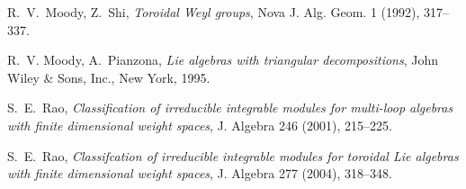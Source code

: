 \documentclass[11pt]{amsproc}
\theoremstyle{definition}
\theoremstyle{remark}
\numberwithin{equation}{section} \errorcontextlines=0
\begin{document}
\begin{thebibliography}{99}
 R.~V.~Moody, Z.~Shi, {\em Toroidal Weyl groups},
Nova J. Alg. Geom. 1 (1992), 317--337.

 R.~V. Moody, A.~Pianzona, {\em Lie algebras with triangular decompositions}, John Wiley \& Sons, Inc., New York, 1995.

 S.~E.~Rao, {\em Classification of irreducible integrable modules for multi-loop algebras with finite dimensional
weight spaces}, J. Algebra 246 (2001), 215--225.

 S.~E.~Rao, {\em Classifcation of irreducible integrable modules for toroidal Lie algebras with finite dimensional
weight spaces}, J. Algebra 277 (2004), 318--348.

\end{thebibliography}
\end{document}
